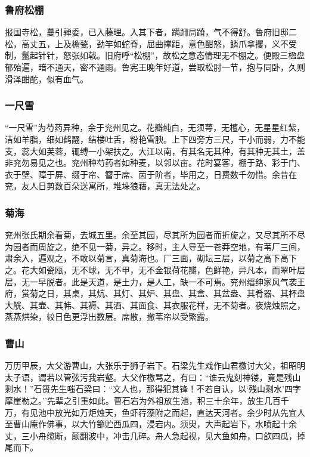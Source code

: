 \documentclass[]{article}
\begin{document}
\hypertarget{header-n489}{%
\subsubsection{鲁府松棚}\label{header-n489}}

报国寺松，蔓引亸委，已入藤理。入其下者，蹒跚局蹐，气不得舒。鲁府旧邸二松，高丈五，上及檐甃，劲竿如蛇脊，屈曲撑距，意色酣怒，鳞爪拿攫，义不受制，鬣起针针，怒张如戟。旧府呼``松棚''，故松之意态情理无不棚之。便殿三楹盘郁殆遍，暗不通天，密不通雨。鲁宪王晚年好道，尝取松肘一节，抱与同卧，久则滑泽酣酡，似有血气。

\hypertarget{header-n494}{%
\subsubsection{一尺雪}\label{header-n494}}

``一尺雪''为芍药异种，余于兖州见之。花瓣纯白，无须萼，无檀心，无星星红紫，洁如羊脂，细如鹤翮，结楼吐舌，粉艳雪腴。上下四旁方三尺，干小而弱，力不能支，蕊大如芙蓉，辄缚一小架扶之。大江以南，有其名无其种，有其种无其土，盖非兖勿易见之也。兖州种芍药者如种麦，以邻以亩。花时宴客，棚于路、彩于门、衣于壁、障于屏、缀于帘、簪于席、茵于阶者，毕用之，日费数千勿惜。余昔在兖，友人日剪数百朵送寓所，堆垛狼藉，真无法处之。

\hypertarget{header-n499}{%
\subsubsection{菊海}\label{header-n499}}

兖州张氏期余看菊，去城五里。余至其园，尽其所为园者而折旋之，又尽其所不尽为园者而周旋之，绝不见一菊，异之。移时，主人导至一苍莽空地，有苇厂三间，肃余入，遍观之，不敢以菊言，真菊海也。厂三面，砌坛三层，以菊之高下高下之。花大如瓷瓯，无不球，无不甲，无不金银荷花瓣，色鲜艳，异凡本，而翠叶层层，无一早脱者。此是天道，是土力，是人工，缺一不可焉。兖州缙绅家风气袭王府，赏菊之日，其桌，其炕、其灯、其炉、其盘、其盒、其盆盎、其肴器、其杯盘大觥、其壶、其帏、其褥、其酒、其面食、其衣服花样，无不菊者。夜烧烛照之，蒸蒸烘染，较日色更浮出数层。席散，撤苇帘以受繁露。

\hypertarget{header-n504}{%
\subsubsection{曹山}\label{header-n504}}

万历甲辰，大父游曹山，大张乐于狮子岩下。石梁先生戏作山君檄讨大父，祖昭明太子语，谓若以管弦污我岩壑。大父作檄骂之，有曰：``谁云鬼刻神镂，竟是残山剩水！''石篑先生嗤石梁曰：``文人也，那得犯其锋！不若自认，以`残山剩水'四字摩崖勒之。''先辈之引重如此。曹石宕为外祖放生池，积三十余年，放生几百千万，有见池中放光如万炬烛天，鱼虾荇藻附之而起，直达天河者。余少时从先宜人至曹山庵作佛事，以大竹篰贮西瓜四，浸宕内。须臾，大声起岩下，水喷起十余丈，三小舟缆断，颠翻波中，冲击几碎。舟人急起视，见大鱼如舟，口欱四瓜，掉尾而下。
\end{document}
